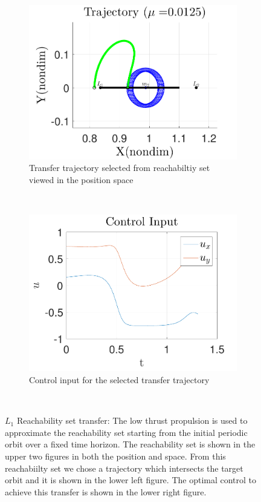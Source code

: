 \documentclass[smallcondensed]{svjour3}
\begin{document}
\begin{figure}
        \begin{subfigure}[htbp]{0.5\textwidth} 
                \includegraphics[width=\textwidth]{reach_transfer} 
                \caption{Transfer trajectory selected from reachabiltiy set viewed in the position space} \label{fig:reach_transfer} 
        \end{subfigure}~ 
        \begin{subfigure}[htbp]{0.5\textwidth} 
                \includegraphics[width=\textwidth]{control_input_l1} 
                \caption{Control input for the selected transfer trajectory} \label{fig:control_l1} 
        \end{subfigure}~
        \caption{\( L_1 \) Reachability set transfer: The low thrust propulsion is used to approximate the reachability set starting from the initial periodic orbit over a fixed time horizon.
        The reachability set is shown in the upper two figures in both the position and \Poincare space.
    From this reachabiilty set we chose a trajectory which intersects the target orbit and it is shown in the lower left figure.
The optimal control to achieve this transfer is shown in the lower right figure.}
        \label{fig:reachability_set_transfer} 
\end{figure}
\end{document}
